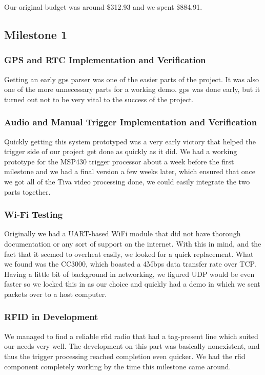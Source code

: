 \documentclass[12pt]{article}
\begin{document}
Our original budget was around \$312.93 and we spent \$884.91.

\subsection{Milestone 1}
\subsubsection{GPS and RTC Implementation and Verification}
Getting an early \gls{gps} parser was one of the easier parts of the project.
It was also one of the more unnecessary parts for a working demo. \gls{gps} was
done early, but it turned out not to be very vital to the success of the
project.

\subsubsection{Audio and Manual Trigger Implementation and Verification}
Quickly getting this system prototyped was a very early victory that helped the
trigger side of our project get done as quickly as it did. We had a working
prototype for the MSP430 trigger processor about a week before the first
milestone and we had a final version a few weeks later, which ensured that once
we got all of the Tiva video processing done, we could easily integrate the two
parts together.

\subsubsection{Wi-Fi Testing}
Originally we had a UART-based WiFi module that did not have thorough
documentation or any sort of support on the internet. With this in mind, and
the fact that it seemed to overheat easily, we looked for a quick replacement.
What we found was the CC3000, which boasted a 4Mbps data transfer rate over
TCP.  Having a little bit of background in networking, we figured UDP would be
even faster so we locked this in as our choice and quickly had a demo in which
we sent packets over to a host computer.

\subsubsection{RFID in Development}
We managed to find a reliable \gls{rfid} radio that had a tag-present line
which suited our needs very well. The development on this part was basically
nonexistent, and thus the trigger processing reached completion even quicker.
We had the \gls{rfid} component completely working by the time this milestone
came around.
\end{document}
